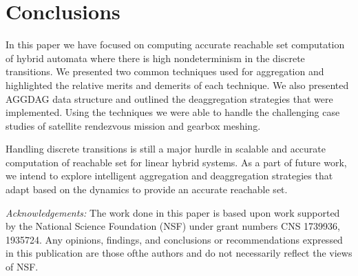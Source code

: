 \documentclass[acmsmall]{acmart}
\begin{document}


\maketitle

%
%
%






\section{Conclusions}
In this paper we have focused on computing accurate reachable set computation of hybrid automata where there is high nondeterminism in the discrete transitions. We presented two common techniques used for aggregation and highlighted the relative merits and demerits of each technique. We also presented AGGDAG data structure and outlined the deaggregation strategies that were implemented. Using the techniques we were able to handle the challenging case studies of satellite rendezvous mission and gearbox meshing.

Handling discrete transitions is still a major hurdle in scalable and accurate computation of reachable set for linear hybrid systems. As a part of future work, we intend to explore intelligent aggregation and deaggregation strategies that adapt based on the dynamics to provide an accurate reachable set.

\emph{Acknowledgements:} The work done in this paper is based upon work supported by the National Science Foundation (NSF) under grant numbers CNS 1739936, 1935724. Any opinions, findings, and conclusions or recommendations expressed in this publication are those ofthe authors and do not necessarily reflect the views of NSF.

\vspace{-0.2cm}


\end{document}

